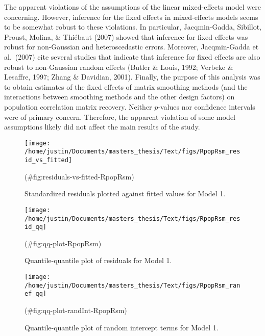 \begin{appendix}
The apparent violations of the assumptions of the linear mixed-effects
model were concerning. However, inference for the fixed effects in
mixed-effects models seems to be somewhat robust to these violations. In
particular, Jacqmin-Gadda, Sibillot, Proust, Molina, \& Thiébaut (2007)
showed that inference for fixed effects was robust for non-Gaussian and
heteroscedastic errors. Moreover, Jacqmin-Gadda et al.~(2007) cite
several studies that indicate that inference for fixed effects are also
robust to non-Gaussian random effects (Butler \& Louis, 1992; Verbeke \&
Lesaffre, 1997; Zhang \& Davidian, 2001). Finally, the purpose of this
analysis was to obtain estimates of the fixed effects of matrix
smoothing methods (and the interactions between smoothing methods and
the other design factors) on population correlation matrix recovery.
Neither \(p\)-values nor confidence intervals were of primary concern.
Therefore, the apparent violation of some model assumptions likely did
not affect the main results of the study.

\begin{figure}

{\centering \texttt{[image: /home/justin/Documents/masters\_thesis/Text/figs/RpopRsm\_resid\_vs\_fitted]} 

}

\caption{Standardized residuals plotted against fitted values for Model 1.}(\#fig:residuals-vs-fitted-RpopRsm)
\end{figure}

\begin{figure}

{\centering \texttt{[image: /home/justin/Documents/masters\_thesis/Text/figs/RpopRsm\_resid\_qq]} 

}

\caption{Quantile-quantile plot of residuals for Model 1.}(\#fig:qq-plot-RpopRsm)
\end{figure}

\begin{figure}

{\centering \texttt{[image: /home/justin/Documents/masters\_thesis/Text/figs/RpopRsm\_ranef\_qq]} 

}

\caption{Quantile-quantile plot of random intercept terms for Model 1.}(\#fig:qq-plot-randInt-RpopRsm)
\end{figure}

\hypertarget{model-2-regression-model-predicting-log-textrmrmsemathbff-hatmathbff}{%
}
\end{appendix}
